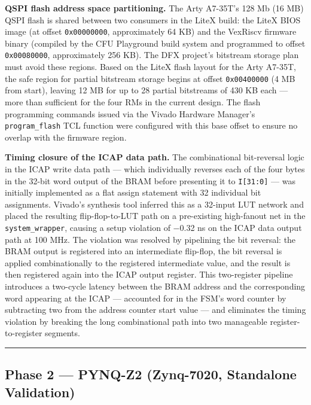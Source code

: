 \textbf{QSPI flash address space partitioning.} The Arty A7-35T's 128 Mb (16 MB) QSPI flash is shared between two consumers in the LiteX build: the LiteX BIOS image (at offset \texttt{0x00000000}, approximately 64 KB) and the VexRiscv firmware binary (compiled by the CFU Playground build system and programmed to offset \texttt{0x00080000}, approximately 256 KB). The DFX project's bitstream storage plan must avoid these regions. Based on the LiteX flash layout for the Arty A7-35T, the safe region for partial bitstream storage begins at offset \texttt{0x00400000} (4 MB from start), leaving 12 MB for up to 28 partial bitstreams of 430 KB each — more than sufficient for the four RMs in the current design. The flash programming commands issued via the Vivado Hardware Manager's \texttt{program\_flash} TCL function were configured with this base offset to ensure no overlap with the firmware region.

\textbf{Timing closure of the ICAP data path.} The combinational bit-reversal logic in the ICAP write data path — which individually reverses each of the four bytes in the 32-bit word output of the BRAM before presenting it to \texttt{I[31:0]} — was initially implemented as a flat assign statement with 32 individual bit assignments. Vivado's synthesis tool inferred this as a 32-input LUT network and placed the resulting flip-flop-to-LUT path on a pre-existing high-fanout net in the \texttt{system\_wrapper}, causing a setup violation of −0.32 ns on the ICAP data output path at 100 MHz. The violation was resolved by pipelining the bit reversal: the BRAM output is registered into an intermediate flip-flop, the bit reversal is applied combinationally to the registered intermediate value, and the result is then registered again into the ICAP output register. This two-register pipeline introduces a two-cycle latency between the BRAM address and the corresponding word appearing at the ICAP — accounted for in the FSM's word counter by subtracting two from the address counter start value — and eliminates the timing violation by breaking the long combinational path into two manageable register-to-register segments.

\vspace{0.4em}\hrule\vspace{0.4em}

\subsection{Phase 2 — PYNQ-Z2 (Zynq-7020, Standalone Validation)}

